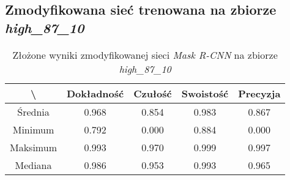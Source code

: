 \subsection{Zmodyfikowana sieć trenowana na zbiorze \textit{high\_87\_10}}

\begin{table}[H]
	\centering
	\caption{Złożone wyniki zmodyfikowanej sieci \textit{Mask R-CNN} na zbiorze \textit{high\_87\_10}}
	\vspace{6pt}
	{\footnotesize
		\begin{tabular}{|c|c|c|c|c|}
      \hline \textbackslash & Dokładność & Czułość & Swoistość & Precyzja \\
      \hline Średnia & 0.968 & 0.854 & 0.983 & 0.867 \\
      \hline Minimum & 0.792 & 0.000 & 0.884 & 0.000 \\
      \hline Maksimum & 0.993 & 0.970 & 0.999 & 0.997 \\
      \hline Mediana & 0.986 & 0.953 & 0.993 & 0.965 \\
      \hline
		\end{tabular}
	}
  \vspace{0pt}
  \label{Tab:high_modified_calculated}
\end{table}

